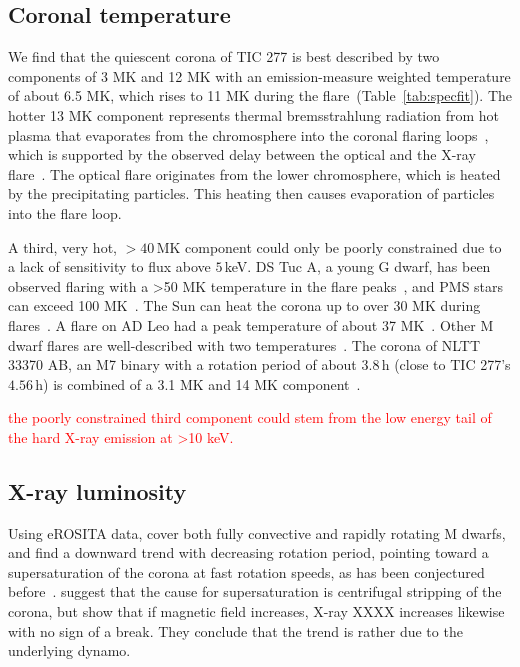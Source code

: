 \documentclass[twocolumn]{aastex631}
\begin{document}
\subsection{Coronal temperature}
\label{sec:discussion:xraytemp}

We find that the quiescent corona of TIC 277 is best described by two components of 3 MK and 12 MK with an emission-measure weighted temperature of about 6.5 MK, which rises to 11 MK during the flare~(Table~\ref{tab:specfit}). The hotter 13 MK component represents thermal bremsstrahlung radiation from hot plasma that evaporates from the chromosphere into the coronal flaring loops~\citep{benz2016flare}, which is supported by the observed delay between the optical and the X-ray flare~\citep{hawley2003multiwavelength}. The optical flare originates from the lower chromosphere, which is heated by the precipitating particles. This heating then causes evaporation of particles into the flare loop. 

A third, very hot, $>40\,$MK component could only be poorly constrained due to a lack of sensitivity to flux above $5\,$keV. DS Tuc A, a young G dwarf, has been observed flaring with a >50 MK temperature in the flare peaks~\citep{pillitteri2022xraya}, and PMS stars can exceed 100 MK~\citep{getman2008xray, getman2021xray}. The Sun can heat the corona up to over 30 MK during flares~\citep{benz2016flare}. A flare on AD Leo had a peak temperature of about 37 MK~\citep{stelzer2022great}. Other M dwarf flares are well-described with two temperatures~\citep{behr2023muscles, magaudda2022firsta}. The corona of NLTT 33370 AB, an M7 binary with a rotation period of about $3.8\,$h (close to TIC 277's $4.56\,$h) is combined of a 3.1 MK and 14 MK component~\citep{williams2015simultaneous}. 

\textcolor{red}{the poorly constrained third component could stem from the low energy tail of the hard X-ray emission at >10 keV.}






\subsection{X-ray luminosity}
\label{sec:discussion:xraylum}


Using eROSITA data, \citet{magaudda2022first} cover both fully convective and rapidly rotating M dwarfs, and find a downward trend with decreasing rotation period, pointing toward a supersaturation of the corona at fast rotation speeds, as has been conjectured before~\citep{jeffries2011investigating,ramsay2020tess}. \citet{jeffries2011investigating} suggest that the cause for supersaturation is centrifugal stripping of the corona, but \citet{reiners2022magnetism} show that if magnetic field increases, X-ray XXXX increases likewise with no sign of a break. They conclude that the trend is rather due to the underlying dynamo.
\end{document}

